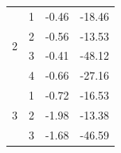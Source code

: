 \begin{table}[H]
\begin{tabular}{|c|c|c|c|}
  \multirow{4}{*}{2}                                                           & 1                                                                            & -0.46                                                                            & -18.46                                                                           \\ \cline{2-4} 
                                                                               & 2                                                                            & -0.56                                                                            & -13.53                                                                           \\ \cline{2-4} 
                                                                               & 3                                                                            & -0.41                                                                            & -48.12                                                                           \\ \cline{2-4} 
                                                                               & 4                                                                            & -0.66                                                                            & -27.16                                                                           \\ \hline
  \multirow{4}{*}{3}                                                           & 1                                                                            & -0.72                                                                            & -16.53                                                                           \\ \cline{2-4} 
                                                                               & 2                                                                            & -1.98                                                                            & -13.38                                                                           \\ \cline{2-4} 
                                                                               & 3                                                                            & -1.68                                                                            & -46.59                                                                           \\ \cline{2-4} 

\end{tabular}
\end{table}
